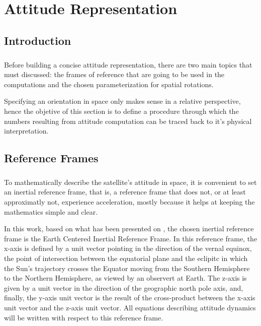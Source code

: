 %
%
%
%
%
%
%
%
%
%

\chapter{Attitude Representation} \label{ch:attitude-representation}

\section{Introduction}

\paragraph{}
\indent 
	Before building a concise attitude representation, there are two main topics that must discussed: the frames of reference that are going to be used in the computations and the chosen parameterization for spatial rotations. 

\indent
	Specifying an orientation in space only makes sense in a relative perspective, hence the objetive of this section is to define a procedure through which the numbers resulting from attitude computation can be traced back to it's physical interpretation. 

\section{Reference Frames}

\paragraph{}
\indent
	To mathematically describe the satellite's attitude in space, it is convenient to set an inertial reference frame, that is, a reference frame that does not, or at least approximatly not, experience acceleration, mostly because it helps at keeping the mathematics simple and clear. 

\indent 
	In this work, based on what has been presented on \cite{AAUSAT3}, the chosen inertial reference frame is the Earth Centered Inertial Reference Frame. In this reference frame, the x-axis is defined by a unit vector pointing in the direction of the vernal equinox, the point of intersection between the equatorial plane and the eclipitc in which the Sun's trajectory crosses the Equator moving from the Southern Hemisphere to the Northern Hemisphere, as viewed by an observert at Earth. The z-axis  is given by a unit vector in the direction of the geographic north pole axis, and, finally, the y-axis unit vector is the result of the cross-product between the x-axis unit vector and the z-axis unit vector. All equations describing attitude dynamics will be written with respect to this reference frame.

